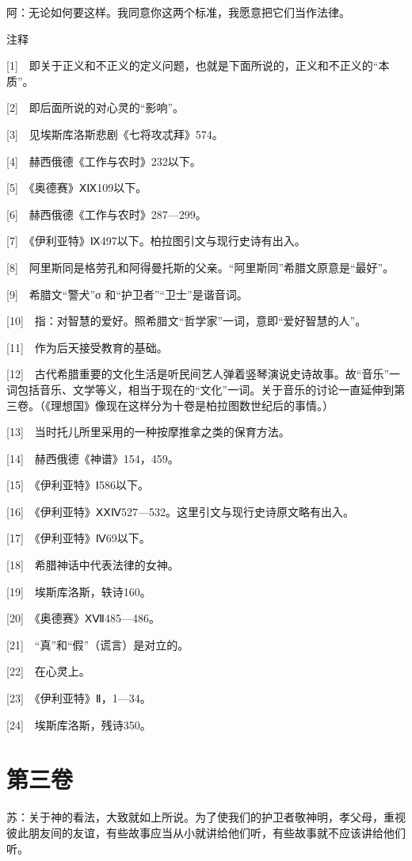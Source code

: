 \documentclass[12pt,oneside]{book}
\begin{document}
阿：无论如何要这样。我同意你这两个标准，我愿意把它们当作法律。

注释

[1]　即关于正义和不正义的定义问题，也就是下面所说的，正义和不正义的“本质”。

[2]　即后面所说的对心灵的“影响”。

[3]　见埃斯库洛斯悲剧《七将攻忒拜》574。

[4]　赫西俄德《工作与农时》232以下。

[5]　《奥德赛》ⅩⅨ109以下。

[6]　赫西俄德《工作与农时》287—299。

[7]　《伊利亚特》Ⅸ497以下。柏拉图引文与现行史诗有出入。

[8]　阿里斯同是格劳孔和阿得曼托斯的父亲。“阿里斯同”希腊文原意是“最好”。

[9]　希腊文“警犬”σ 和“护卫者”“卫士”是谐音词。

[10]　指：对智慧的爱好。照希腊文“哲学家”一词，意即“爱好智慧的人”。

[11]　作为后天接受教育的基础。

[12]　古代希腊重要的文化生活是听民间艺人弹着竖琴演说史诗故事。故“音乐”一词包括音乐、文学等义，相当于现在的“文化”一词。关于音乐的讨论一直延伸到第三卷。（《理想国》像现在这样分为十卷是柏拉图数世纪后的事情。）

[13]　当时托儿所里采用的一种按摩推拿之类的保育方法。

[14]　赫西俄德《神谱》154，459。

[15]　《伊利亚特》Ⅰ586以下。

[16]　《伊利亚特》ⅩⅩⅣ527—532。这里引文与现行史诗原文略有出入。

[17]　《伊利亚特》Ⅳ69以下。

[18]　希腊神话中代表法律的女神。

[19]　埃斯库洛斯，轶诗160。

[20]　《奥德赛》ⅩⅦ485—486。

[21]　“真”和“假”（谎言）是对立的。

[22]　在心灵上。

[23]　《伊利亚特》Ⅱ，1—34。

[24]　埃斯库洛斯，残诗350。





\chapter{第三卷}

苏：关于神的看法，大致就如上所说。为了使我们的护卫者敬神明，孝父母，重视彼此朋友间的友谊，有些故事应当从小就讲给他们听，有些故事就不应该讲给他们听。
\end{document}
